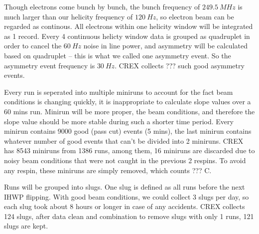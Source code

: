 Though electrons come bunch by bunch, the bunch frequency of $249.5\ MHz$ is much
larger than our helicity frequency of $120\ Hz$, so electron beam can be regarded
as continous. All electrons within one helicity window will be integrated as 1
record. Every 4 continuous helicty window data is grouped as quadruplet 
in order to cancel the $60\ Hz$ noise in line power, and asymmetry will be 
calculated based on quadruplet -- this is what we called one asymmetry event.
So the asymmetry event frequency is $30\ Hz$. CREX collects ??? such good 
asymmetry events.

Every run is seperated into multiple miniruns to account for the fact beam
conditions is changing quickly, it is inappropriate to calculate slope values
over a 60 mins run. Minirun will be more proper, the beam conditions, and therefore
the slope value should be more stable during such a shorter time period.  
Every minirun contains 9000 good (pass cut) events (5 mins), the last minirun contains 
whatever number of good events that can't be divided into 2 miniruns. 
CREX has 8543 miniruns from 1386 runs, among them, 16 miniruns are discarded
due to noisy beam conditions that were not caught in the previous 2 respins.
To avoid any respin, these miniruns are simply removed, which counts ??? C.

Runs will be grouped into slugs. One slug is defined as all runs before the next
IHWP flipping. With good beam conditions, we could collect 3 slugs per day, so 
each slug took about 8 hours or longer in case of any accidents. CREX collects
124 slugs, after data clean and combination to remove slugs with only 1 runs, 
121 slugs are kept.

